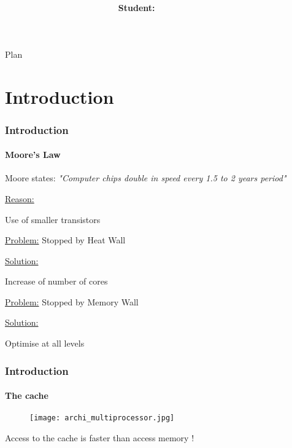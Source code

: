 \documentclass{beamer}
\title[Oral Presentation]{
        {\bfseries \projet\\} 
        {\bfseries \huge \sujet}
}
\institute[3A]{
  {\normalsize \bfseries \sffamily Professor:} {\large \prof}~~~\\ 
  
}
\author[Zenati]{
  {\normalsize \bfseries \sffamily Student:} {\large \gA}~~~~~~~~~~\\
}
\begin{document}
        
\begin{frame}
\maketitle
\end{frame}

\begin{frame}{Plan}
\tableofcontents
\end{frame}


\section{Introduction}
\begin{frame}
\frametitle{Introduction}
\framesubtitle{Moore's Law}
Moore states: \textit{"Computer chips double in speed every 1.5 to 2 years period"}
\pause
\begin{exampleblock}{}
\underline{Reason:}
\begin{center}
Use of smaller transistors
\end{center}
\end{exampleblock}{}
\pause
\underline{Problem:} Stopped by Heat Wall
\pause
\begin{exampleblock}{}
\underline{Solution:}
\begin{center}
Increase of number of cores
\end{center}
\end{exampleblock}{}
\pause
\underline{Problem:} Stopped by Memory Wall
\pause
\begin{exampleblock}{}
\underline{Solution:} 
\begin{center}
Optimise at all levels
\end{center}
\end{exampleblock}{}
\end{frame}

\begin{frame}
\frametitle{Introduction}
\framesubtitle{The cache}
\begin{figure}
\texttt{[image: archi\_multiprocessor.jpg]}
\end{figure}
\begin{center}
Access to the cache is faster than access memory !
\end{center}
\end{frame}
\end{document}
